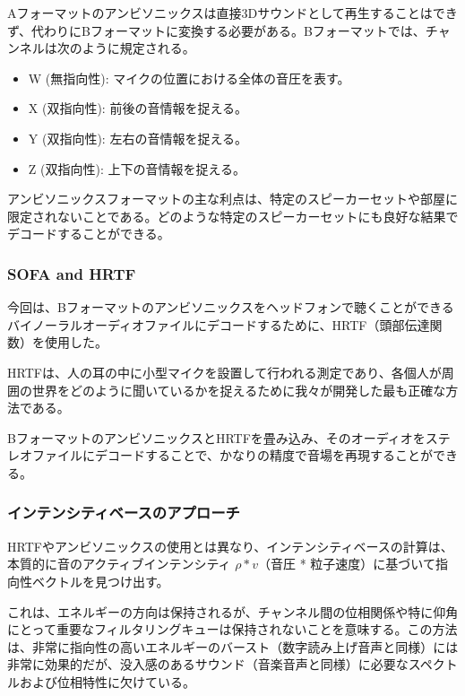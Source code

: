 \documentclass[a4paper, 12pt]{article}
\begin{document}
Aフォーマットのアンビソニックスは直接3Dサウンドとして再生することはできず、代わりにBフォーマットに変換する必要がある。Bフォーマットでは、チャンネルは次のように規定される。

\begin{itemize}
    \item W (無指向性): マイクの位置における全体の音圧を表す。
    \item X (双指向性): 前後の音情報を捉える。
    \item Y (双指向性): 左右の音情報を捉える。
    \item Z (双指向性): 上下の音情報を捉える。
\end{itemize}

アンビソニックスフォーマットの主な利点は、特定のスピーカーセットや部屋に限定されないことである。どのような特定のスピーカーセットにも良好な結果でデコードすることができる。

\subsubsection{SOFA and HRTF}

今回は、Bフォーマットのアンビソニックスをヘッドフォンで聴くことができるバイノーラルオーディオファイルにデコードするために、HRTF（頭部伝達関数）を使用した。\cite{ling2023implementation} 

HRTFは、人の耳の中に小型マイクを設置して行われる測定であり、各個人が周囲の世界をどのように聞いているかを捉えるために我々が開発した最も正確な方法である。

BフォーマットのアンビソニックスとHRTFを畳み込み、そのオーディオをステレオファイルにデコードすることで、かなりの精度で音場を再現することができる。

\subsubsection{インテンシティベースのアプローチ}

HRTFやアンビソニックスの使用とは異なり、インテンシティベースの計算は、本質的に音のアクティブインテンシティ $\rho * v$（音圧 * 粒子速度）に基づいて指向性ベクトルを見つけ出す。

これは、エネルギーの方向は保持されるが、チャンネル間の位相関係や特に仰角にとって重要なフィルタリングキューは保持されないことを意味する。この方法は、非常に指向性の高いエネルギーのバースト（数字読み上げ音声と同様）には非常に効果的だが、没入感のあるサウンド（音楽音声と同様）に必要なスペクトルおよび位相特性に欠けている。
\end{document}
